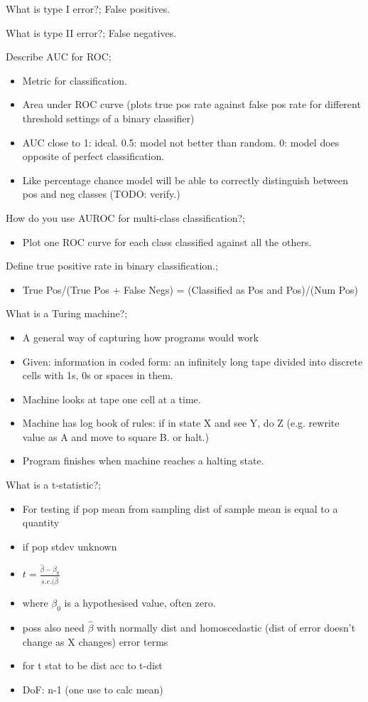 \documentclass{article}
\begin{document}
What is type I error?; False positives. 

What is type II error?; False negatives.

Describe AUC for ROC; \begin{itemize} \item Metric for classification. \item Area under ROC curve (plots true pos rate against false pos rate for different threshold settings of a binary classifier) \item AUC close to 1: ideal. 0.5: model not better than random. 0: model does opposite of perfect classification.  \item Like percentage chance model will be able to correctly distinguish between pos and neg classes (TODO: verify.) \end{itemize}

How do you use AUROC for multi-class classification?; \begin{itemize} \item Plot one ROC curve for each class classified against all the others. \end{itemize}

Define true positive rate in binary classification.; \begin{itemize} \item True Pos/(True Pos + False Negs) = (Classified as Pos and Pos)/(Num Pos) \end{itemize}

What is a Turing machine?; \begin{itemize} \item A general way of capturing how programs would work \item Given: information in coded form: an infinitely long tape divided into discrete cells with 1s, 0s or spaces in them. \item Machine looks at tape one cell at a time. \item Machine has log book of rules: if in state X and see Y, do Z (e.g. rewrite value as A and move to square B. or halt.) \item Program finishes when machine reaches a halting state. \end{itemize}

What is a t-statistic?; \begin{itemize} \item For testing if pop mean from sampling dist of sample mean is equal to a quantity \item if pop stdev unknown \item $t = \frac{\hat{\beta}-\beta_0}{s.e.(\hat{\beta}}$ \item where $\beta_0$ is a hypothesised value, often zero. \item poss also need $\hat{\beta}$ with normally dist and homoscedastic (dist of error doesn't change as X changes) error terms \item for t stat to be dist acc to t-dist \item DoF: n-1 (one use to calc mean) \end{itemize} 
\end{document}
